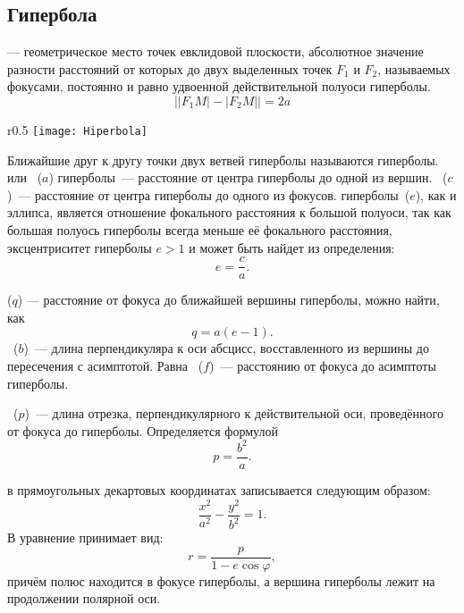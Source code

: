 \subsection{Гипербола}
 
{\bfseries {}} --- геометрическое место точек евклидовой плоскости, абсолютное значение разности расстояний от которых до двух выделенных точек $F_1$ и $F_2$, называемых фокусами, постоянно и равно удвоенной действительной полуоси гиперболы.
\begin{equation}
\bigl||F_1M|-|F_2M|\bigr| = 2a
\end{equation}

\begin{wrapfigure}[14]{r}{0.5\tw}
	\vspace{-1pc}
	\texttt{[image: Hiperbola]}
\end{wrapfigure}
Ближайшие друг к другу точки двух ветвей гиперболы называются  гиперболы.  или ~($a$) гиперболы~--- расстояние от центра гиперболы до одной из вершин. ~($c$)~---  расстояние от центра гиперболы до одного из фокусов.  гиперболы~($e$), как и  эллипса, является отношение фокального расстояния к большой полуоси, так как большая полуось гиперболы всегда меньше её фокального расстояния, эксцентриситет гиперболы $e > 1$ и может быть найдет из определения:
\begin{equation}
e=\frac{c}{a}.
\end{equation}

 ($q$) --- расстояние от фокуса до ближайшей вершины гиперболы, можно найти, как
\begin{equation}
q = a ( e - 1).
\end{equation}
~($b$)~--- длина перпендикуляра к оси абсцисс, восставленного из вершины до пересечения с асимптотой. Равна ~($f$)~--- расстоянию от фокуса до асимптоты гиперболы.

~($p$)~--- длина отрезка, перпендикулярного к действительной оси, проведённого от фокуса до гиперболы. Определяется формулой
\begin{equation}
p=\frac{b^2}{a}.
\end{equation}

 в прямоугольных декартовых координатах записывается следующим образом:
\begin{equation}
\frac{x^2}{a^2}-\frac{y^2}{b^2}=1.
\end{equation}
В  уравнение принимает вид:
\begin{equation}
r=\frac{p}{1-e\cos\varphi},
\end{equation}
причём полюс находится в фокусе гиперболы, а вершина гиперболы лежит на продолжении полярной оси.

